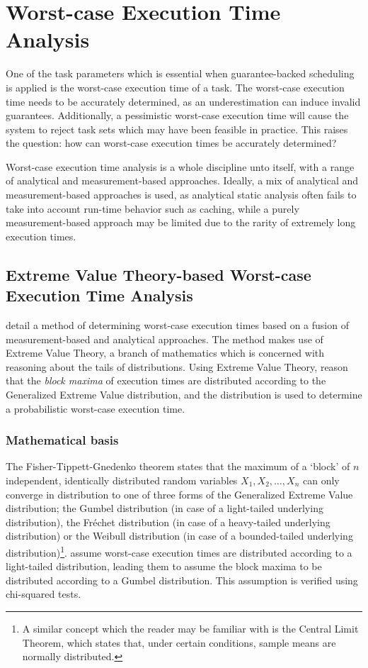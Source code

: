 \section{Worst-case Execution Time Analysis}
One of the task parameters which is essential when guarantee-backed scheduling is applied is the worst-case execution time of a task. The worst-case execution time needs to be accurately determined, as an underestimation can induce invalid guarantees. Additionally, a pessimistic worst-case execution time will cause the system to reject task sets which may have been feasible in practice. This raises the question: how can worst-case execution times be accurately determined?

Worst-case execution time analysis is a whole discipline unto itself, with a range of analytical and measurement-based approaches. Ideally, a mix of analytical and measurement-based approaches is used, as analytical static analysis often fails to take into account run-time behavior such as caching, while a purely measurement-based approach may be limited due to the rarity of extremely long execution times.

\subsection{Extreme Value Theory-based Worst-case Execution Time Analysis}

\textcite{hansen_et_al:wcet} detail a method of determining worst-case execution times based on a fusion of measurement-based and analytical approaches. The method makes use of Extreme Value Theory, a branch of mathematics which is concerned with reasoning about the tails of distributions. Using Extreme Value Theory, \citeauthor*{hansen_et_al:wcet} reason that the \emph{block maxima} of execution times are distributed according to the Generalized Extreme Value distribution, and the distribution is used to determine a probabilistic worst-case execution time.

\subsubsection{Mathematical basis}

The Fisher-Tippett-Gnedenko theorem states that the maximum of a `block' of $n$ independent, identically distributed random variables $X_1, X_2, \ldots, X_n$ can only converge in distribution to one of three forms of the Generalized Extreme Value distribution; the Gumbel distribution (in case of a light-tailed underlying distribution), the Fréchet distribution (in case of a heavy-tailed underlying distribution) or the Weibull distribution (in case of a bounded-tailed underlying distribution)\footnote{A similar concept which the reader may be familiar with is the Central Limit Theorem, which states that, under certain conditions, sample means are normally distributed.}. \citeauthor*{hansen_et_al:wcet} assume worst-case execution times are distributed according to a light-tailed distribution, leading them to assume the block maxima to be distributed according to a Gumbel distribution. This assumption is verified using chi-squared tests.

